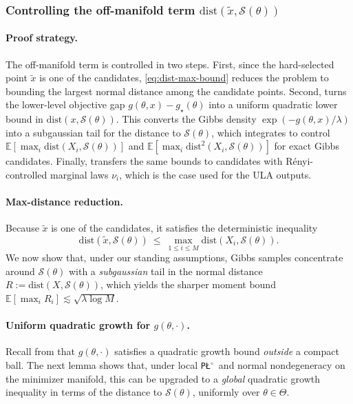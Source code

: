 \documentclass{article}
\theoremstyle{normaltheorem}
\newcommand{\PLcirc}{\texttt{P\L$^\circ$}}
\newcommand{\calS}{\mathcal{S}}
\begin{document}
\subsubsection{Controlling the off-manifold term $\mathrm{dist}(\tilde x,\calS(\theta))$}

\paragraph{Proof strategy.}
The off-manifold term is controlled in two steps. First, since the hard-selected point \(\tilde x\) is one of the
candidates, \eqref{eq:dist-max-bound} reduces the problem to bounding the largest normal distance among the candidate
points. Second,  turns the lower-level objective gap \(g(\theta,x)-g_\star(\theta)\) into a
uniform quadratic lower bound in \(\mathrm{dist}(x,\calS(\theta))\). This converts the Gibbs density
\(\exp(-g(\theta,x)/\lambda)\) into a subgaussian tail for the distance to \(\calS(\theta)\), which
 integrates to control
\(\mathbb E[\max_i \mathrm{dist}(X_i,\calS(\theta))]\) and
\(\mathbb E[\max_i \mathrm{dist}^2(X_i,\calS(\theta))]\) for exact Gibbs candidates. Finally,
 transfers the same bounds to candidates with R\'enyi-controlled marginal laws \(\nu_i\), which is the
case used for the ULA outputs.

\paragraph{Max-distance reduction.}
Because $\tilde x$ is one of the candidates, it satisfies the deterministic inequality
\begin{equation}\label{eq:dist-max-bound}
\mathrm{dist}(\tilde x,\calS(\theta))
\ \le\ \max_{1\le i\le M}\mathrm{dist}(X_i,\calS(\theta)).
\end{equation}
We now show that, under our standing assumptions, Gibbs samples concentrate around $\calS(\theta)$ with a \emph{subgaussian} tail in the
normal distance $R:=\mathrm{dist}(X,\calS(\theta))$, which yields the sharper moment bound
$\mathbb E[\max_i R_i]\lesssim \sqrt{\lambda\log M}$.

\paragraph{Uniform quadratic growth for $g(\theta,\cdot)$.}
Recall from  that $g(\theta,\cdot)$ satisfies a quadratic growth bound \emph{outside} a compact ball.
The next lemma shows that, under local \PLcirc\ and normal nondegeneracy on the minimizer manifold, this can be upgraded to a \emph{global}
quadratic growth inequality in terms of the distance to $\calS(\theta)$, uniformly over $\theta\in\Theta$.
\end{document}

